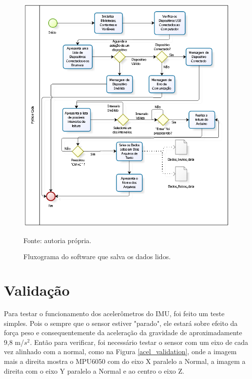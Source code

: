 		
 
		\begin{figure}[h]
			\centering
			\includegraphics[keepaspectratio=true,scale=1]{figuras/diagrama_python.PNG}
			\caption{Fluxograma do software que salva os dados lidos. }
			Fonte: autoria própria. 
			\label{fluxograma_python}	
		\end{figure}
		
\section {Validação}

	Para testar o funcionamento dos acelerômetros do IMU, foi feito um teste simples. Pois o sempre que o sensor estiver "parado", ele estará sobre efeito da força peso e consequentemente da aceleração da gravidade de aproximadamente 9,8 m/$ s^2 $. Então para verificar, foi necessário testar o sensor com um eixo de cada vez alinhado com a normal, como na Figura \ref{acel_validation}, onde a imagem mais a direita mostra o MPU6050 com do eixo X paralelo a Normal, a imagem a direita com o eixo Y paralelo a Normal e ao centro o eixo Z.
	
